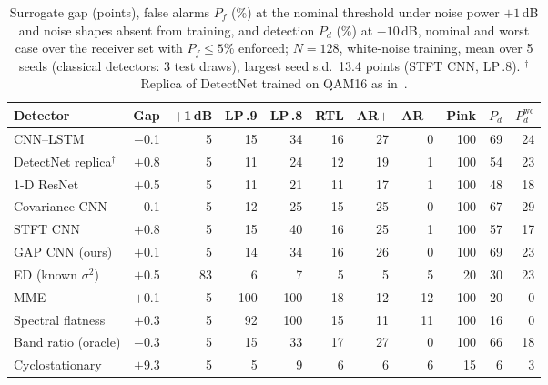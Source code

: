 \begin{table}[t]
\centering
\caption{Surrogate gap (points), false alarms $P_f$ (\%) at the nominal threshold under noise power $+1$\,dB and noise shapes absent from training, and detection $P_d$ (\%) at $-10$\,dB, nominal and worst case over the receiver set with $P_f\le5\%$ enforced; $N=128$, white-noise training, mean over 5 seeds (classical detectors: 3 test draws), largest seed s.d.\ 13.4 points (STFT CNN, LP\,.8). $^{\dagger}$Replica of DetectNet trained on QAM16 as in~\cite{gao2019deep}.}
\label{tab:main}
\setlength{\tabcolsep}{4.2pt}
\begin{tabular}{lrrrrrrrrrr}
\toprule
Detector & Gap & +1\,dB & LP\,.9 & LP\,.8 & RTL & AR$+$ & AR$-$ & Pink & $P_d$ & $P_d^{\mathrm{wc}}$ \\
\midrule
CNN--LSTM~\cite{gao2019deep} & $-$0.1 & 5 & 15 & 34 & 16 & 27 & 0 & 100 & 69 & 24 \\
DetectNet replica$^{\dagger}$ & $+$0.8 & 5 & 11 & 24 & 12 & 19 & 1 & 100 & 54 & 23 \\
1-D ResNet~\cite{zheng2020spectrum} & $+$0.5 & 5 & 11 & 21 & 11 & 17 & 1 & 100 & 48 & 18 \\
Covariance CNN~\cite{liu2019cmcnn} & $-$0.1 & 5 & 12 & 25 & 15 & 25 & 0 & 100 & 67 & 29 \\
STFT CNN~\cite{chen2021stft} & $+$0.8 & 5 & 15 & 40 & 16 & 25 & 1 & 100 & 57 & 17 \\
GAP CNN (ours) & $+$0.1 & 5 & 14 & 34 & 16 & 26 & 0 & 100 & 69 & 23 \\
\midrule
ED (known $\sigma^2$) & $+$0.5 & 83 & 6 & 7 & 5 & 5 & 5 & 20 & 30 & 23 \\
MME~\cite{zeng2009eigen} & $+$0.1 & 5 & 100 & 100 & 18 & 12 & 12 & 100 & 20 & 0 \\
Spectral flatness & $+$0.3 & 5 & 92 & 100 & 15 & 11 & 11 & 100 & 16 & 0 \\
Band ratio (oracle) & $-$0.3 & 5 & 15 & 33 & 17 & 27 & 0 & 100 & 66 & 18 \\
Cyclostationary & $+$9.3 & 5 & 5 & 9 & 6 & 6 & 6 & 15 & 6 & 3 \\
\bottomrule
\end{tabular}
\end{table}
